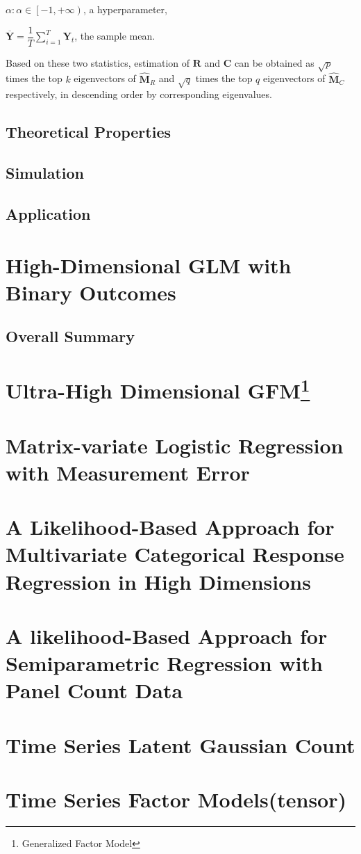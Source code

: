 \documentclass{article}[12pt]
\begin{document}
$\alpha: \alpha \in \left[-1,+\infty \right)$, a hyperparameter,

$\mathbf{\overline{Y}}=\dfrac{1}{T} \sum\limits_{i=1}^T\mathbf{Y}_t$, the sample mean.

Based on these two statistics, estimation of $\mathbf{R}$ and $\mathbf{C}$ can be obtained as $\sqrt{p}$ times the top $k$ eigenvectors of $\widehat{\mathbf{M}}_R$ and $\sqrt{q}$ times the top $q$ eigenvectors of $\widehat{\mathbf{M}}_C$ respectively, in descending order by corresponding eigenvalues.

\subsection{Theoretical Properties}

 

\subsection{Simulation}

\subsection{Application}
\section{High-Dimensional GLM with Binary Outcomes}
\subsection{Overall Summary}
\section [Ultra-High Dimensional GFM]{Ultra-High Dimensional GFM\footnote{Generalized Factor Model}}  

\section{Matrix-variate Logistic Regression with Measurement Error}
\section{A Likelihood-Based Approach for Multivariate Categorical Response Regression in High Dimensions}
\section{A likelihood-Based Approach for Semiparametric Regression with Panel Count Data}


\section{Time Series Latent Gaussian Count}
\section{Time Series Factor Models(tensor)}   
\end{document}
